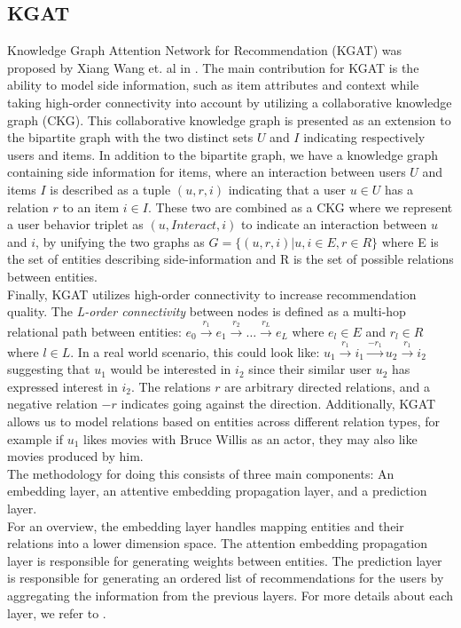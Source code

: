 \subsection{KGAT}
Knowledge Graph Attention Network for Recommendation (KGAT) was proposed by Xiang Wang et. al in \cite{KGAT}.
The main contribution for KGAT is the ability to model side information, such as item attributes and context while taking high-order connectivity into account by utilizing a collaborative knowledge graph (CKG).
This collaborative knowledge graph is presented as an extension to the bipartite graph with the two distinct sets $U$ and $I$ indicating respectively users and items.
In addition to the bipartite graph, we have a knowledge graph containing side information for items, where an interaction between users $U$ and items $I$ is described as a tuple $(u, r, i)$ indicating that a user $u \in U$ has a relation $r$ to an item $i \in I$.
These two are combined as a CKG where we represent a user behavior triplet as $(u, Interact, i)$ to indicate an interaction between $u$ and $i$, by unifying the two graphs as $G = \{(u, r, i) | u, i \in E, r \in R\}$ where E is the set of entities describing side-information and R is the set of possible relations between entities.\\
Finally, KGAT utilizes high-order connectivity to increase recommendation quality.
The \textit{L-order connectivity} between nodes is defined as a multi-hop relational path between entities: $e_0 \overset{r_1}{\rightarrow} e_1 \overset{r_2}{\rightarrow} \dots \overset{r_L}{\rightarrow} e_L$ where $e_l \in E$ and $r_l \in R$ where $l \in L$.
In a real world scenario, this could look like: $u_1 \overset{r_1}{\rightarrow} i_1 \overset{-r_1}{\rightarrow} u_2 \overset{r_1}{\rightarrow} i_2$ suggesting that $u_1$ would be interested in $i_2$ since their similar user $u_2$ has expressed interest in $i_2$.
The relations $r$ are arbitrary directed relations, and a negative relation $-r$ indicates going against the direction.
Additionally, KGAT allows us to model relations based on entities across different relation types, for example if $u_1$ likes movies with Bruce Willis as an actor, they may also like movies produced by him.
\\
The methodology for doing this consists of three main components: An embedding layer, an attentive embedding propagation layer, and a prediction layer.\\
For an overview, the embedding layer handles mapping entities and their relations into a lower dimension space.
The attention embedding propagation layer is responsible for generating weights between entities.
The prediction layer is responsible for generating an ordered list of recommendations for the users by aggregating the information from the previous layers.
For more details about each layer, we refer to \cite{KGAT}.